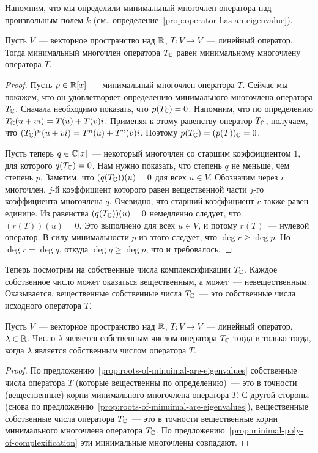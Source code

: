 Напомним, что мы определили минимальный многочлен оператора
над произвольным полем $k$
(см.~определение~\ref{prop:operator-has-an-eigenvalue}).
\begin{proposition}\label{prop:minimal-poly-of-complexification}
Пусть $V$~--- векторное пространство над $\mathbb R$, $T\colon V\to V$~--- линейный
оператор. Тогда минимальный многочлен оператора $T_\mathbb C$ равен
минимальному многочлену оператора $T$.
\end{proposition}
\begin{proof}
Пусть $p\in \mathbb R[x]$~--- минимальный многочлен оператора $T$.
Сейчас мы покажем, что он удовлетворяет определению минимального многочлена
оператора $T_\mathbb C$. Сначала необходимо показать, что $p(T_\mathbb C) = 0$.
Напомним, что по определению $T_\mathbb C(u+vi) = T(u) + T(v)i$.
Применяя к этому равенству оператор $T_\mathbb C$, получаем,
что $(T_\mathbb C)^n(u+vi) = T^n(u) + T^n(v)i$.
Поэтому $p(T_\mathbb C) = (p(T))_\mathbb C = 0$.

Пусть теперь $q\in\mathbb C[x]$~--- некоторый многочлен со старшим коэффициентом $1$,
для которого $q(T_\mathbb C)=0$. Нам нужно показать, что степень $q$ не меньше,
чем степень $p$. Заметим, что $(q(T_\mathbb C))(u) = 0$ для всех $u\in V$.
Обозначим через $r$ многочлен, $j$-й коэффициент которого равен
вещественной части $j$-го коэффициента многочлена $q$.
Очевидно, что старший коэффициент $r$ также равен единице.
Из равенства $(q(T_\mathbb C))(u) = 0$ немедленно следует, что $(r(T))(u) = 0$.
Это выполнено для всех $u\in V$, и потому $r(T)$~--- нулевой оператор.
В силу минимальности $p$ из этого следует, что $\deg r \geq \deg p$.
Но $\deg r = \deg q$, откуда $\deg q\geq \deg p$, что и требовалось.
\end{proof}

Теперь посмотрим на собственные числа комплексификации $T_\mathbb C$.
Каждое собственное число может оказаться вещественным, а может~---
невещественным. Оказывается, вещественные собственные числа
$T_\mathbb C$~--- это собственные числа исходного оператора $T$.
\begin{proposition}\label{prop:complexification-real-eigenvalues}
Пусть $V$~--- векторное пространство над $\mathbb R$, $T\colon V\to V$~---
линейный оператор, $\lambda\in\mathbb R$.
Число $\lambda$ является собственным числом оператора $T_\mathbb C$
тогда и только тогда, когда $\lambda$ является собственным числом
оператора $T$.
\end{proposition}
\begin{proof}
По предложению~\ref{prop:roots-of-minuimal-are-eigenvalues}
собственные числа оператора $T$ (которые вещественны по определению)~---
это в точности (вещественные) корни минимального многочлена оператора $T$.
С другой стороны
(снова по предложению~\ref{prop:roots-of-minuimal-are-eigenvalues}),
вещественные собственные числа оператора $T_\mathbb C$~---
это в точности вещественные корни минимального многочлена оператора $T_\mathbb C$.
По предложению~\ref{prop:minimal-poly-of-complexification} эти минимальные
многочлены совпадают.
\end{proof}

